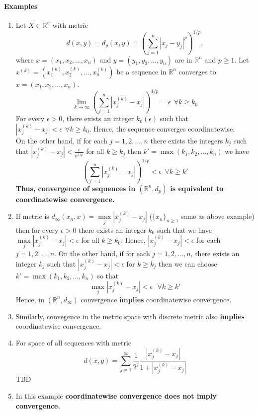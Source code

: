 \documentclass[12pt]{report}
\theoremstyle{definition}
\begin{document}
\paragraph*{Examples}
\begin{enumerate}
    \item Let $X \in \mathbb{R}^n$ with metric
    $$ d(x,y) = d_p(x,y) = \left(\sum_{j=1}^n|x_j - y_j|^p\right)^{1/p},$$
    where $x = (x_1, x_2, \dots,x_n)$ and $y = (y_1,  y_2, \dots,y_n)$ are in $\mathbb{R}^n$ and $p \geq 1$. Let $x^{(k)} = (x_1^{(k)},x_2^{(k)},\dots,x_n^{(k)})$ be a sequence in $\mathbb{R}^n$ converges to $x = (x_1,x_2,\dots,x_n)$. 
    $$ \lim_{k\to \infty}\left(\sum\limits_{j=1}^{n}|x_j^{(k)} - x_j|\right)^{1/p} = \epsilon~~\forall k \geq k_0$$
    For every $\epsilon > 0$, there exists an integer $k_0(\epsilon)$ such that $|x_j^{(k)} - x_j| < \epsilon~~\forall k \geq k_0$. Hence, the sequence converges coordinatewise.\\
    On the other hand, if for each $j = 1, 2, \dots, n$ there exists the integers $k_j$ such that $|x_j^{(k)} - x_j| < \frac{\epsilon}{n^{1/p}}$ for all $k \geq k_j$ then $k' = \max(k_1, k_2,\dots, k_n)$ we have
    $$ \left(\sum\limits_{j=1}^{n}|x_j^{(k)} - x_j|\right)^{1/p} < \epsilon~~\forall k \geq k'$$
    \textbf{Thus, convergence of sequences in $(\mathbb{R}^n,d_p)$ is equivalent to coordinatewise convergence.}
    \item If metric is $ d_{\infty}(x_n,x) = \max\limits_j|x_j^{(k)} - x_j|$ ($\{x_n\}_{n \geq 1}$ same as above example) then for every $\epsilon > 0$ there exists an integer $k_0$ such that we have $\max\limits_j|x_j^{(k)} - x_j| < \epsilon$ for all $k \geq k_0$. Hence, $|x_j^{(k)} - x_j| < \epsilon$ for each $j = 1,2, \dots,n$. On the other hand, if for each $ j = 1,2,\dots, n$, there exists an integer $k_j$ such that $|x_j^{(k)} - x_j| < \epsilon$ for $ k \geq k_j$ then we can choose $ k' = \max(k_1, k_2, \dots, k_n)$ so that
    $$ \max\limits_j|x_j^{(k)} - x_j| < \epsilon~~~\forall k \geq k'$$
    Hence, in $(\mathbb{R}^n,d_{\infty})$ convergence \textbf{implies} coordinatewise convergence.
    \item Similarly, convegence in the metric space with discrete metric also \textbf{implies} coordinatewise convergence.
    \item For space of all sequences with metric 
    $$ d(x,y) = \sum\limits_{j = 1}^{\infty} \frac{1}{2^j}\frac{|x_j^{(k)} - x_j|}{1 + |x_j^{(k)} - x_j|}$$
    TBD
    \item In this example \textbf{coordinatewise convergence does not imply convergence.}\\

\end{enumerate}
\end{document}
